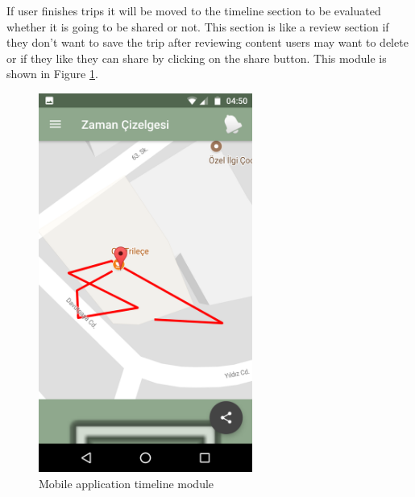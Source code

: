 If user finishes trips it will be moved to the timeline section to be evaluated whether it is going to be shared or not. This section is like a review section if they don't want to save the trip after reviewing content users may want to delete or if they like they can share by clicking on the share button. This module is shown in Figure \ref{fig:timeLine}.

\begin{figure}[!htbp]
\centering
\includegraphics[width=70mm,scale=0.7]{projectChapters/images/timeLine.png}
\caption{Mobile application timeline module}
\label{fig:timeLine}
\end{figure}
 









